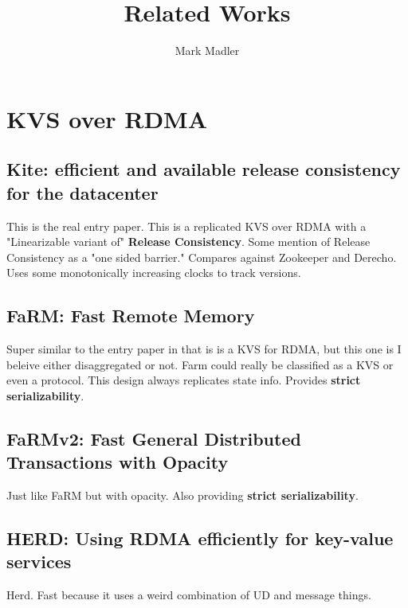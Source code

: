 \documentclass[sigplan,nonacm]{acmart}
\title{Related Works}
\author{Mark Madler}
\begin{document}
\maketitle


\section{KVS over RDMA}

    \subsection{Kite: efficient and available release consistency for the datacenter}
    This is the real entry paper. This is a replicated KVS over RDMA with a 
    "Linearizable variant of" \textbf{Release Consistency}. Some mention of Release Consistency
    as a "one sided barrier." Compares against Zookeeper and Derecho. Uses some 
    monotonically increasing clocks to track versions.\cite{Gavrielatos-PPoPP-2020} 

    \subsection{FaRM: Fast Remote Memory}
    Super similar to the entry paper in that is is a KVS for RDMA, but this one is I beleive either disaggregated or not. 
    Farm could really be classified as a KVS or even a protocol. This design always replicates state info. 
    Provides \textbf{strict serializability}.\cite{Dragojevic-NSDI-2014}

    \subsection{FaRMv2: Fast General Distributed Transactions with Opacity}
    Just like FaRM but with opacity. Also providing \textbf{strict serializability}.\cite{Shamis-SIGMOD-2019}

    \subsection{HERD: Using RDMA efficiently for key-value services}
    Herd. Fast because it uses a weird combination of UD and message things.\cite {Kalia-SIGCOMM-2014}
\end{document}
